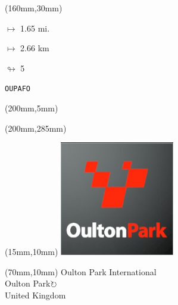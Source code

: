 \begin{textblock*}{40mm}(160mm,30mm)%
\Large
\par$\mapsto$ 1.65 mi.
\par$\mapsto$ 2.66 km
\par$\looparrowright$ 5
\par\hfill\tiny\tt OUPAFO\\
\end{textblock*}
\begin{textblock*}{20mm}(200mm,5mm)%
\fbox{\thepage}
\label{OUPAFO}
\end{textblock*}
\begin{textblock*}{20mm}(200mm,285mm)%
\fbox{\thepage}
\end{textblock*}

\null\newpage
\begin{textblock*}{50mm}(15mm,10mm)%
\includegraphics[width=50mm]{LG/2015-05-20_00091.png}
\end{textblock*}
\begin{textblock*}{130mm}(70mm,10mm)%
{\fontsize{20}{20}\selectfont Oulton Park International\\}
{\fontsize{16}{16}\selectfont Oulton Park\hfill \Large$\circlearrowright$\\}
{\fontsize{12}{12}\selectfont United Kingdom\\}
\end{textblock*}
